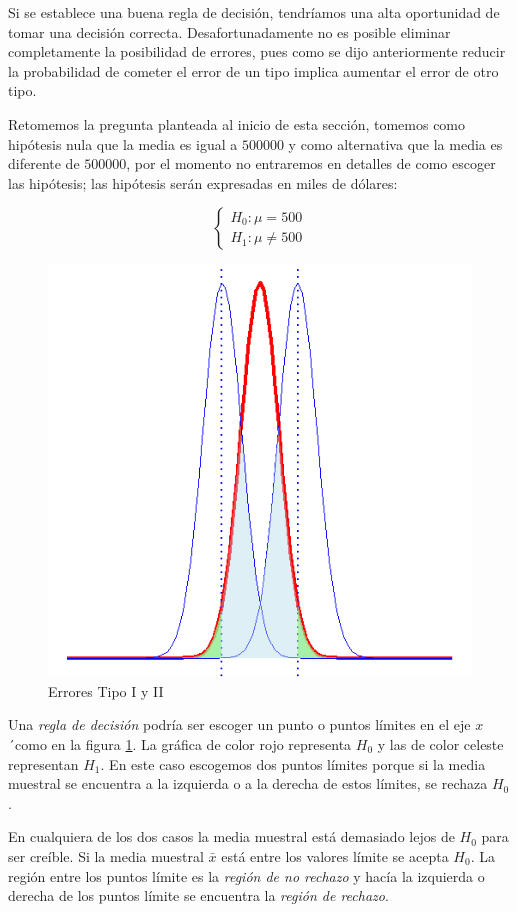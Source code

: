 \documentclass[letterpaper,]{book}
\begin{document}
Si se establece una buena regla de decisión, tendríamos una alta oportunidad de tomar una decisión correcta. Desafortunadamente no es posible eliminar completamente la posibilidad de errores, pues como se dijo anteriormente reducir la probabilidad de cometer el error de un tipo implica aumentar el error de otro tipo.

Retomemos la pregunta planteada al inicio de esta sección, tomemos como hipótesis nula que la media es igual a \(500000\) y como alternativa que la media es diferente de \(500000\), por el momento no entraremos en detalles de como escoger las hipótesis; las hipótesis serán expresadas en miles de dólares:

\begin{equation} 
\begin{cases} 
H_0: \mu = 500 \\ 
H_1: \mu \neq 500
\end{cases} 
\end{equation}

\begin{figure}[h!]

{\centering \includegraphics[width=0.5\linewidth]{phtest} 

}

\caption{Errores Tipo I y II}\label{fig:pht}
\end{figure}

Una \emph{regla de decisión} podría ser escoger un punto o puntos límites en el eje \(x\)´como en la figura \ref{fig:pht}. La gráfica de color rojo representa \(H_0\) y las de color celeste representan \(H_1\). En este caso escogemos dos puntos límites porque si la media muestral se encuentra a la izquierda o a la derecha de estos límites, se rechaza \(H_0\).

En cualquiera de los dos casos la media muestral está demasiado lejos de \(H_0\) para ser creíble. Si la media muestral \(\bar{x}\) está entre los valores límite se acepta \(H_0\). La región entre los puntos límite es la \emph{región de no rechazo} y hacía la izquierda o derecha de los puntos límite se encuentra la \emph{región de rechazo}.
\end{document}
